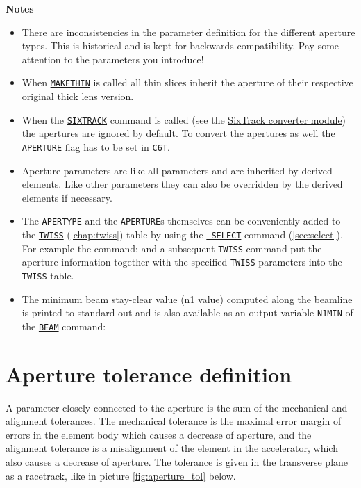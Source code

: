 {\bf Notes}
\begin{itemize}
   \item There are inconsistencies in the parameter definition for the
     different aperture types. This is historical and is kept for
     backwards compatibility. Pay some attention to the parameters you
     introduce! 

   \item When \hyperref[chap:makethin]{\tt MAKETHIN} is called all
     thin slices inherit the aperture of their respective original thick
     lens version.  

   \item When the \hyperref[chap:c6t]{\tt SIXTRACK} command is called (see the
     \hyperref[chap:sixtrack]{SixTrack converter module}) the apertures are
     ignored by default. To convert the apertures as well the {\tt APERTURE}
     flag has to be set in {\tt C6T}.  

   \item  Aperture parameters are like all parameters and are inherited
     by derived elements. Like other parameters they can also be overridden by
     the derived elements if necessary.  

   \item The {\tt APERTYPE} and the {\tt APERTURE}s themselves can be
     conveniently added to the \hyperref[chap:twiss]{\texttt{TWISS}} 
     (\autoref{chap:twiss}) table by using the \hyperref[sec:select]{\tt 
     SELECT} command (\autoref{sec:select}). For example the command:    
     and a subsequent {\tt TWISS} command put the aperture information together 
     with the specified {\tt TWISS} parameters into the {\tt TWISS} table.

   \item The minimum beam stay-clear value (n1 value) computed along the 
     beamline is printed to standard out and is also available as an output 
     variable {\tt N1MIN} of the \hyperref[sec:beam]{\tt BEAM} command: 

\end{itemize}

\section{Aperture tolerance definition}
\label{sec:apertol}
A parameter closely connected to the aperture is the sum of the
mechanical and alignment tolerances. The mechanical tolerance is 
the maximal error margin of errors in the element body which 
causes a decrease of aperture, and the alignment tolerance is a 
misalignment of the element in the accelerator, which also causes a 
decrease of aperture. The tolerance is given in the transverse plane 
as a racetrack, like in picture \ref{fig:aperture_tol} below. 

